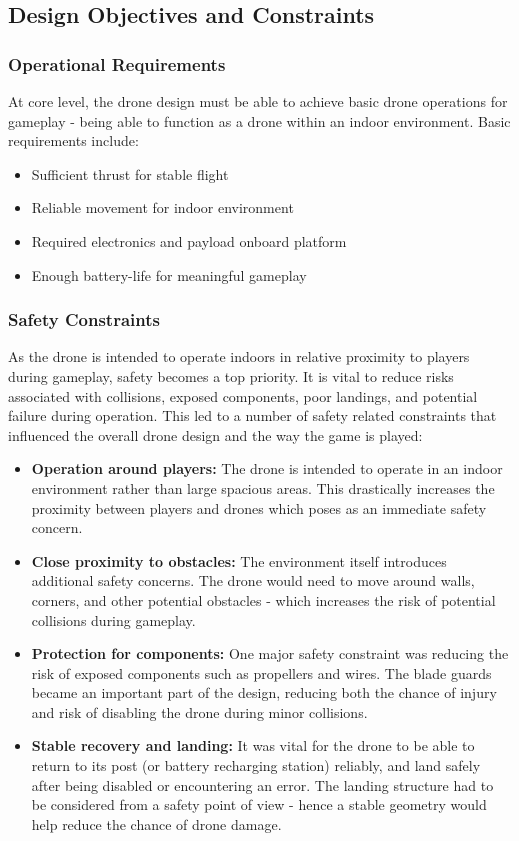 \documentclass{report_template_oxford}
\begin{document}
\subsection{Design Objectives and Constraints}
\subsubsection{Operational Requirements}

At core level, the drone design must be able to achieve basic drone operations for gameplay - being able to function as a drone within an indoor environment. Basic requirements include: 
\begin{itemize}
    \item Sufficient thrust for stable flight
    \item Reliable movement for indoor environment
    \item Required electronics and payload onboard platform
    \item Enough battery-life for meaningful gameplay
\end{itemize}

\subsubsection{Safety Constraints}

As the drone is intended to operate indoors in relative proximity to players during gameplay, safety becomes a top priority. It is vital to reduce risks associated with collisions, exposed components, poor landings, and potential failure during operation. This led to a number of safety related constraints that influenced the overall drone design and the way the game is played:
\begin{itemize}
    \item \textbf{Operation around players: } The drone is intended to operate in an indoor environment rather than large spacious areas. This drastically increases the proximity between players and drones which poses as an immediate safety concern.
    \item \textbf{Close proximity to obstacles: } The environment itself introduces additional safety concerns. The drone would need to move around walls, corners, and other potential obstacles - which increases the risk of potential collisions during gameplay.
    \item \textbf{Protection for components: } One major safety constraint was reducing the risk of exposed components such as propellers and wires. The blade guards became an important part of the design, reducing both the chance of injury and risk of disabling the drone during minor collisions.
    \item \textbf{Stable recovery and landing: } It was vital for the drone to be able to return to its post (or battery recharging station) reliably, and land safely after being disabled or encountering an error. The landing structure had to be considered from a safety point of view - hence a stable geometry would help reduce the chance of drone damage.
\end{itemize}
\end{document}
